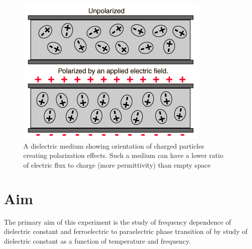 \documentclass[%
 aip,
 amsmath,amssymb,
 reprint, floatfix%
]{revtex4-1}
\begin{document}
    \begin{figure}
        \centering
        \includegraphics[scale = 0.5]{Figures/Diel.png}
        \caption{A dielectric medium showing orientation of charged particles creating polarization effects. Such a medium can have a lower ratio of electric flux to charge (more permittivity) than empty space}
        \label{fig:diel}
    \end{figure}

\section{Aim}
    The primary aim of this experiment is the study of frequency dependence of dielectric constant and ferroelectric to paraelectric phase transition of  by study of dielectric constant as a function of temperature and frequency.
\end{document}
